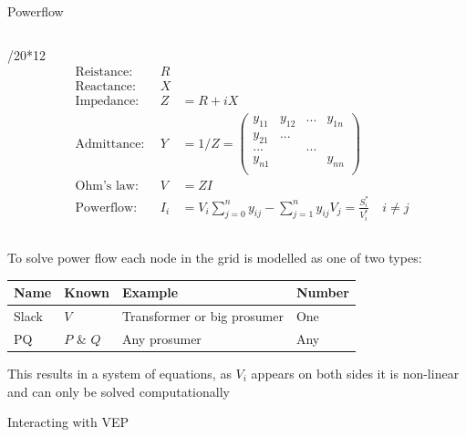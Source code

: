 \documentclass[final]{beamer}
\newlength{\colwidth}
\begin{document}
\begin{frame}[t]
\begin{columns}[t]
\begin{column}{\colwidth}
\begin{block}{Powerflow}
\begin{columns}[t]
\begin{column}{\colwidth/20*12}
      \begin{equation}
        \begin{aligned}
          &\text{Reistance}: \ \ & R\\
          &\text{Reactance}: \ \ & X\\
          &\text{Impedance}: \ \ & Z   &= R + iX\\
          &\text{Admittance}:\ \ & Y   &= 1/Z = \begin{pmatrix}y_{11}&y_{12}&...&y_{1n}\\y_{21}&...&&\\...&&...&\\y_{n1}&&&y_{nn}\\\end{pmatrix}\\
          &\text{Ohm's law}: \ \ & V   &= Z I \\
          &\text{Powerflow}: \ \ & I_i &= V_i \sum_{j=0}^n y_{ij} - \sum_{j=1}^n y_{ij} V_j = \frac{S_i^*}{V_i^*} \quad i \neq j
        \end{aligned}
      \end{equation}
      
    \end{column}

  \end{columns}

  \vspace{1cm}

  To solve power flow each node in the grid is modelled as one of two types:

  \begin{center}
    \begin{tabular}{ llll } 
     Name & Known       & Example                     & Number \\ 
     \hline
     Slack& $V$         & Transformer or big prosumer & One\\
     PQ   & $P$ \& $Q$  & Any prosumer                & Any\\
    \end{tabular}
  \end{center}

  This results in a system of equations, as $V_i$ appears on both sides it is non-linear and
  can only be solved computationally

  \end{block}


  \begin{block}{Interacting with VEP}

    \begin{figure}
      \centering
      \begin{tikzpicture}[scale=2]


\end{tikzpicture}
\end{figure}
\end{block}
\end{column}
\end{columns}
\end{frame}
\end{document}
